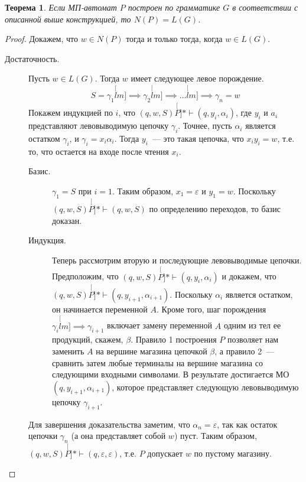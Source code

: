 \documentclass[a4paper,12pt]{article}
\newtheorem*{theorem}{Теорема}
\begin{document}
\begin{theorem}
	Если МП-автомат \(P\) построен по грамматике \(G\) в соответствии с описанной выше конструкцией, то \(N(P) = L(G)\).
\end{theorem}
\begin{proof}
	Докажем, что  \(w \in N(P)\) тогда и только тогда, когда \(w \in L(G)\).
	\begin{description}
		\item[Достаточность.] Пусть \(w \in L(G)\). Тогда \(w\) имеет следующее левое порождение.
		\[S = \gamma_1 \stackrel[lm]{}{\implies} \gamma_2 \stackrel[lm]{}{\implies} \ldots \stackrel[lm]{}{\implies} \gamma_n = w\]
		Покажем индукцией по \(i\), что \((q, w, S) \stackrel[P]{*}{\vdash} (q, y_i, \alpha_i)\), где \(y_i\) и \(a_i\) представляют левовыводимую цепочку \(\gamma_i\). Точнее, пусть \(\alpha_i\) является остатком \(\gamma_i\), и \(\gamma_i = x_i \alpha_i\). Тогда \(y_i\)~--- это такая цепочка, что \(x_i y_i = w\), т.е. то, что остается на входе после чтения \(x_i\).
		
		\begin{description}
			\item[Базис.] \(\gamma_1 = S\) при \(i = 1\). Таким образом, \(x_1 = \varepsilon\) и \(y_1 = w\). Поскольку \((q, w, S) \stackrel[P]{*}{\vdash} (q, w, S)\) по определению переходов, то базис доказан.
			
			\item[Индукция.] Теперь рассмотрим вторую и последующие левовыводимые цепочки. Предположим, что \((q, w, S) \stackrel[P]{*}{\vdash} (q, y_i, \alpha_i)\) и докажем, что \((q, w, S) \stackrel[P]{*}{\vdash} (q, y_{i + 1}, \alpha_{i + 1})\). Поскольку \(\alpha_i\) является остатком, он начинается переменной \(A\). Кроме того, шаг порождения \(\gamma_{i} \stackrel[lm]{}{\implies} \gamma_{i + 1}\) включает замену переменной \(A\) одним из тел ее продукций, скажем, \(\beta\). Правило 1 построения \(P\) позволяет нам заменить \(A\) на вершине магазина цепочкой \(\beta\), а правило 2~--- сравнить затем любые терминалы на вершине магазина со следующими входными символами. В результате достигается МО \((q, y_{i +1}, \alpha_{i + 1})\), которое представляет следующую левовыводимую цепочку \(\gamma_{i + 1}\).
		\end{description}
		Для завершения доказательства заметим, что \(\alpha_n = \varepsilon\), так как остаток цепочки \(\gamma_n\) (а она представляет собой \(w\)) пуст. Таким образом, \((q, w, S) \stackrel[P]{*}{\vdash} (q, \varepsilon, \varepsilon)\), т.е. \(P\) допускает \(w\) по пустому магазину.
		

\end{description}
\end{proof}
\end{document}
